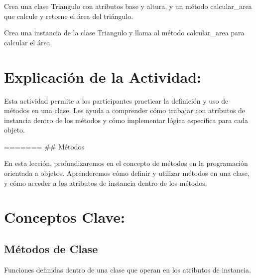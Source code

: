 \documentclass[
  a4paper,
  DIV=11,
  numbers=noendperiod,
  onepage,
  openany]{scrreprt}
\begin{document}
\begin{tcolorbox}[enhanced jigsaw, colbacktitle=quarto-callout-important-color!10!white, toprule=.15mm, leftrule=.75mm, titlerule=0mm, opacityback=0, rightrule=.15mm, opacitybacktitle=0.6, breakable, left=2mm, coltitle=black, title=\textcolor{quarto-callout-important-color}{\faExclamation}\hspace{0.5em}{Actividad Práctica:}, toptitle=1mm, bottomtitle=1mm, arc=.35mm, bottomrule=.15mm, colback=white, colframe=quarto-callout-important-color-frame]

Crea una clase Triangulo con atributos base y altura, y un método
calcular\_area que calcule y retorne el área del triángulo.

Crea una instancia de la clase Triangulo y llama al método
calcular\_area para calcular el área.

\end{tcolorbox}

\hypertarget{explicaciuxf3n-de-la-actividad-50}{%
\section{Explicación de la
Actividad:}\label{explicaciuxf3n-de-la-actividad-50}}

Esta actividad permite a los participantes practicar la definición y uso
de métodos en una clase. Les ayuda a comprender cómo trabajar con
atributos de instancia dentro de los métodos y cómo implementar lógica
específica para cada objeto.

======= \#\# Métodos

En esta lección, profundizaremos en el concepto de métodos en la
programación orientada a objetos. Aprenderemos cómo definir y utilizar
métodos en una clase, y cómo acceder a los atributos de instancia dentro
de los métodos.

\hypertarget{conceptos-clave-53}{%
\section{Conceptos Clave:}\label{conceptos-clave-53}}

\hypertarget{muxe9todos-de-clase-1}{%
\subsection{Métodos de Clase}\label{muxe9todos-de-clase-1}}

Funciones definidas dentro de una clase que operan en los atributos de
instancia.
\end{document}
